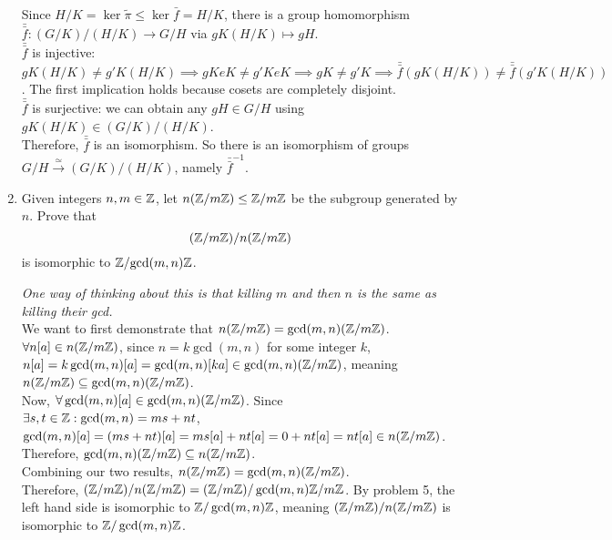 \documentclass{amsart}
\begin{document}
\begin{enumerate}[itemsep=0.2in]
Since $H/K=\ker\tilde{\pi}\leq\ker\bar{f}=H/K$, there is a group homomorphism $\bar{\bar{f}}:(G/K)/(H/K)\to G/H$ via $gK(H/K)\mapsto gH$.\\

$\bar{\bar{f}}$ is injective: $gK(H/K)\neq g'K(H/K)\implies gKeK\neq g'KeK\implies gK\neq g'K\implies \bar{\bar{f}}(gK(H/K))\neq\bar{\bar{f}}(g'K(H/K))$. The first implication holds because cosets are completely disjoint.\\

$\bar{\bar{f}}$ is surjective: we can obtain any $gH\in G/H$ using $gK(H/K)\in (G/K)/(H/K)$. \\

Therefore, $\bar{\bar{f}}$ is an isomorphism. So there is an isomorphism of groups $G/H\xrightarrow{\simeq}(G/K)/(H/K)$, namely $\bar{\bar{f}}^{-1}$.


\vspace{0.2in}

\item Given integers $n,m\in\mathbb{Z}$, let $n(\mathbb{Z}/m\mathbb{Z})\leq\mathbb{Z}/m\mathbb{Z}$ be the subgroup generated by $n$. Prove that 
\[
(\mathbb{Z}/m\mathbb{Z})/n(\mathbb{Z}/m\mathbb{Z})
\]
is isomorphic to $\mathbb{Z}/\mathrm{gcd}(m,n)\mathbb{Z}$.

\emph{One way of thinking about this is that killing $m$ and then $n$ is the same as killing their gcd.}\\

We want to first demonstrate that $n(\mathbb{Z}/m\mathbb{Z})=\gcd(m,n)(\mathbb{Z}/m\mathbb{Z})$.\\

$\forall n[a]\in n(\mathbb{Z}/m\mathbb{Z})$, since $n=k\gcd(m,n)$ for some integer $k$, $n[a]=k\gcd(m,n)[a]=\gcd(m,n)[ka]\in\gcd(m,n)(\mathbb{Z}/m\mathbb{Z})$, meaning $n(\mathbb{Z}/m\mathbb{Z})\subseteq\gcd(m,n)(\mathbb{Z}/m\mathbb{Z})$. \\

Now, $\forall\gcd(m,n)[a]\in\gcd(m,n)(\mathbb{Z}/m\mathbb{Z})$. Since $\exists s,t\in\mathbb{Z}:\gcd(m,n)=ms+nt$, $\gcd(m,n)[a]=(ms+nt)[a]=ms[a]+nt[a]=0+nt[a]=nt[a]\in n(\mathbb{Z}/m\mathbb{Z})$. Therefore, $\gcd(m,n)(\mathbb{Z}/m\mathbb{Z})\subseteq n(\mathbb{Z}/m\mathbb{Z})$.\\

Combining our two results, $n(\mathbb{Z}/m\mathbb{Z})=\gcd(m,n)(\mathbb{Z}/m\mathbb{Z})$.\\

Therefore, $(\mathbb{Z}/m\mathbb{Z})/n(\mathbb{Z}/m\mathbb{Z})=(\mathbb{Z}/m\mathbb{Z})/\gcd(m,n)\mathbb{Z}/m\mathbb{Z}$. By problem 5, the left hand side is isomorphic to $\mathbb{Z}/\gcd(m,n)\mathbb{Z}$, meaning $(\mathbb{Z}/m\mathbb{Z})/n(\mathbb{Z}/m\mathbb{Z})$ is isomorphic to $\mathbb{Z}/\gcd(m,n)\mathbb{Z}$. 



\end{enumerate}
\end{document}
